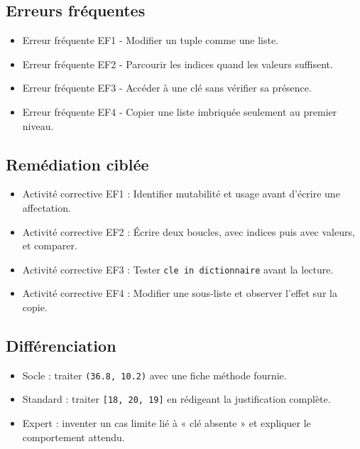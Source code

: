 \subsection{Erreurs fréquentes}

\begin{itemize}
\tightlist
\item
  Erreur fréquente EF1 - Modifier un tuple comme une liste.
\item
  Erreur fréquente EF2 - Parcourir les indices quand les valeurs
  suffisent.
\item
  Erreur fréquente EF3 - Accéder à une clé sans vérifier sa présence.
\item
  Erreur fréquente EF4 - Copier une liste imbriquée seulement au premier
  niveau.
\end{itemize}

\subsection{Remédiation ciblée}

\begin{itemize}
\tightlist
\item
  Activité corrective EF1 : Identifier mutabilité et usage avant
  d'écrire une affectation.
\item
  Activité corrective EF2 : Écrire deux boucles, avec indices puis avec
  valeurs, et comparer.
\item
  Activité corrective EF3 : Tester \texttt{cle\ in\ dictionnaire} avant
  la lecture.
\item
  Activité corrective EF4 : Modifier une sous-liste et observer l'effet
  sur la copie.
\end{itemize}

\subsection{Différenciation}

\begin{itemize}
\tightlist
\item
  Socle : traiter \texttt{(36.8,\ 10.2)} avec une fiche méthode fournie.
\item
  Standard : traiter \texttt{{[}18,\ 20,\ 19{]}} en rédigeant la
  justification complète.
\item
  Expert : inventer un cas limite lié à « clé absente » et expliquer le
  comportement attendu.
\end{itemize}

